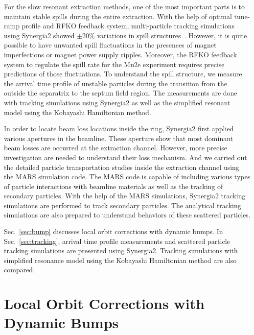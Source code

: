 \documentclass[aps,prstab,onecolumn,preprint]{revtex4-1}
\begin{document}
For the slow resonant extraction methods, one of the most important parts is to maintain stable spills during the entire extraction. With the help of optimal tune-ramp profile and RFKO feedback system, multi-particle tracking simulations using Synergia2 showed \mbox{$\pm 20\%$} variations in spill structures~\cite{mu2e}. However, it is quite possible to have unwanted spill fluctuations in the presences of magnet imperfections or magnet power supply ripples. Moreover, the RFKO feedback system to regulate the spill rate for the Mu2e experiment requires precise predictions of those fluctuations. To understand the spill structure, we measure the arrival time profile of unstable particles during the transition from the outside the separatrix to the septum field region. The measurements are done with tracking simulations using Synergia2 as well as the simplified resonant model using the Kobayashi Hamiltonian method.

In order to locate beam loss locations inside the ring, Synergia2 first applied various apertures in the beamline. These aperture show that most dominant beam losses are occurred at the extraction channel. However, more precise investigation are needed to understand their loss mechanism. And we carried out the detailed particle transportation studies inside the extraction channel using the MARS simulation code. The MARS code is capable of including various types of particle interactions with beamline materials as well as the tracking of secondary particles. With the help of the MARS simulations, Synergia2 tracking simulations are performed to track secondary particles. The analytical tracking simulations are also prepared to understand behaviors of these scattered particles. 



Sec.~\ref{sec:bump} discusses local orbit corrections with dynamic bumps. In Sec.~\ref{sec:tracking}, arrival time profile measurements and scattered particle tracking simulations are presented using Synergia2. Tracking simulations with simplified resonance model using the Kobayashi Hamiltonian method are also compared. %


\section{\label{sec:bump}Local Orbit Corrections with Dynamic Bumps}
\end{document}

